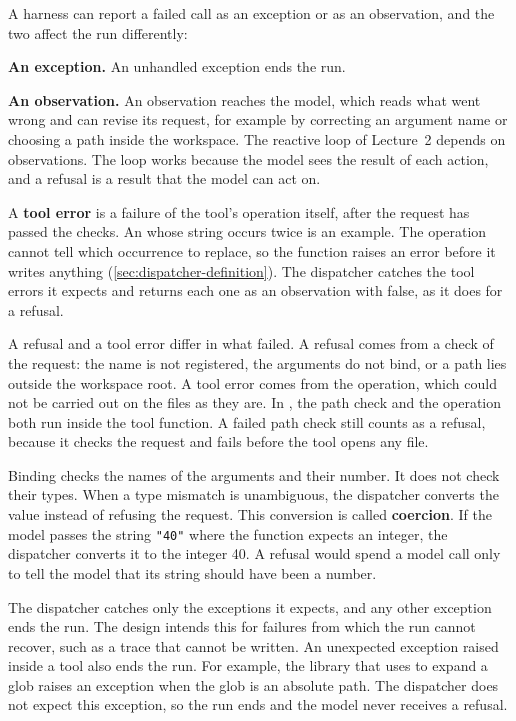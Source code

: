 A harness can report a failed call as an exception or as an observation, and the two affect the run
differently:
\bi
\item \textbf{An exception.} An unhandled exception ends the run.
\item \textbf{An observation.} An observation reaches the model, which reads what went wrong and can
revise its request, for example by correcting an argument name or choosing a path inside the
workspace.
\ei
The reactive loop of Lecture~2 depends on observations. The loop works because the model sees the
result of each action, and a refusal is a result that the model can act on.

A \textbf{tool error} is a failure of the tool's operation itself, after the request has passed the
checks. An  whose  string occurs twice is an example. The operation
cannot tell which occurrence to replace, so the function raises an error before it writes anything
(\cref{sec:dispatcher-definition}). The dispatcher catches the tool errors it expects and returns
each one as an observation with  false, as it does for a refusal.

A refusal and a tool error differ in what failed. A refusal comes from a check of the request: the
name is not registered, the arguments do not bind, or a path lies outside the workspace root. A
tool error comes from the operation, which could not be carried out on the files as they are. In
\msa{}, the path check and the operation both run inside the tool function. A failed path check
still counts as a refusal, because it checks the request and fails before the tool opens any file.

Binding checks the names of the arguments and their number. It does not check their types. When a
type mismatch is unambiguous, the dispatcher converts the value instead of refusing the request.
This conversion is called \textbf{coercion}. If the model passes the string \texttt{"40"} where the
function expects an integer, the dispatcher converts it to the integer 40. A refusal would spend a
model call only to tell the model that its string should have been a number.

The dispatcher catches only the exceptions it expects, and any other exception ends the run. The
design intends this for failures from which the run cannot recover, such as a trace that cannot be
written. An unexpected exception raised inside a tool also ends the run. For example, the library
that  uses to expand a glob raises an exception when the glob is an absolute path.
The dispatcher does not expect this exception, so the run ends and the model never receives a
refusal.


